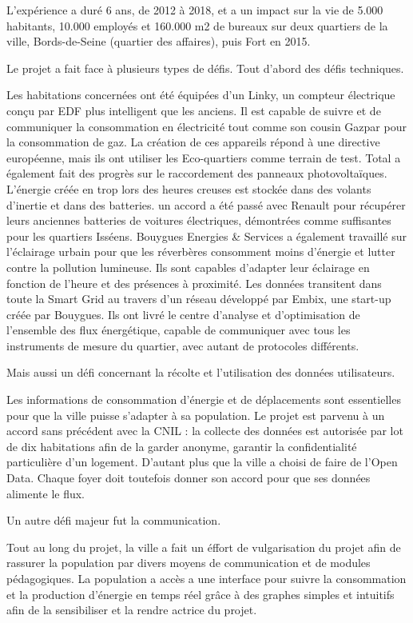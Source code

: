 L'expérience a duré 6 ans, de 2012 à 2018, et a un impact sur la vie de 5.000 habitants, 10.000 employés
et 160.000 m2 de bureaux sur deux quartiers de la ville, Bords-de-Seine (quartier des affaires),
puis Fort en 2015.

Le projet a fait face à plusieurs types de défis. Tout d'abord des défis techniques.

Les habitations concernées ont été équipées d'un Linky, un compteur électrique conçu par EDF
plus intelligent que les anciens. Il est capable de suivre et de communiquer la consommation en
électricité tout comme son cousin Gazpar pour la consommation de gaz. La création de ces appareils répond
à une directive européenne, mais ils ont utiliser les Eco-quartiers comme terrain de test.
Total a également fait des progrès sur le raccordement des panneaux photovoltaïques.
L'énergie créée en trop lors des heures creuses est stockée dans des volants d'inertie et dans des
batteries. un accord a été passé avec Renault pour récupérer leurs anciennes batteries de voitures
électriques, démontrées comme suffisantes pour les quartiers Isséens.
Bouygues Energies \& Services a également travaillé sur l'éclairage urbain pour que les réverbères
consomment moins d'énergie et lutter contre la pollution lumineuse. Ils sont capables d'adapter
leur éclairage en fonction de l'heure et des présences à proximité.
Les données transitent dans toute la Smart Grid au travers d'un réseau développé par Embix, une
start-up créée par Bouygues. Ils ont livré le centre d'analyse et d'optimisation de l'ensemble des
flux énergétique, capable de communiquer avec tous les instruments de mesure du quartier, avec autant de
protocoles différents.

Mais aussi un défi concernant la récolte et l'utilisation des données utilisateurs.

Les informations de consommation d'énergie et de déplacements sont essentielles pour que la ville
puisse s'adapter à sa population. Le projet est parvenu à un accord sans précédent avec la CNIL :
la collecte des données est autorisée par lot de dix habitations afin de la garder anonyme, garantir
la confidentialité particulière d'un logement.
D'autant plus que la ville a choisi de faire de l'Open Data. Chaque foyer doit toutefois
donner son accord pour que ses données alimente le flux.

Un autre défi majeur fut la communication.

Tout au long du projet, la ville a fait un éffort de vulgarisation du projet afin de rassurer
la population par divers moyens de communication et de modules pédagogiques. La population a accès
a une interface pour suivre la consommation et la production d'énergie en temps réel grâce à des
graphes simples et intuitifs afin de la sensibiliser et la rendre actrice du projet.

